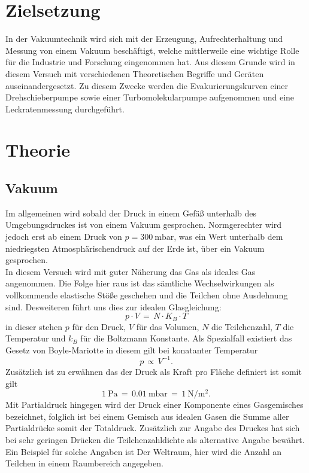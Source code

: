 \section{Zielsetzung}
In der Vakuumtechnik wird sich mit der Erzeugung, Aufrechterhaltung und Messung von einem Vakuum beschäftigt,
welche mittlerweile eine wichtige Rolle für die Industrie und Forschung eingenommen hat. Aus diesem Grunde wird
in diesem Versuch mit verschiedenen Theoretischen Begriffe und Geräten auseinandergesetzt. Zu diesem Zwecke werden
die Evakurierungskurven einer Drehschieberpumpe sowie einer Turbomolekularpumpe aufgenommen und eine Leckratenmessung 
durchgeführt.

\section{Theorie}
\label{sec:Theorie}

\subsection{Vakuum}
\label{sec:vakuumtheo}

Im allgemeinen wird sobald der Druck in einem Gefäß unterhalb des Umgebungsdruckes ist von einem Vakuum gesprochen. Normgerechter 
wird jedoch erst ab einem Druck von $p=\SI{300}{\milli\bar}$, was ein Wert unterhalb dem niedriegsten Atmosphärischendruck auf der 
Erde ist, über ein Vakuum gesprochen.\\
In diesem Versuch wird mit guter Näherung das Gas als ideales Gas angenommen. Die Folge hier raus ist das sämtliche Wechselwirkungen 
als vollkommende elastische Stöße geschehen und die Teilchen ohne Ausdehnung sind. Desweiteren führt uns dies zur idealen Glasgleichung:
\begin {equation}
 p\cdot V\,=\, N\cdot K_B\cdot T
\label{eqn:idealgas}
\end{equation}
in dieser stehen $p$ für den Druck, $V$ für das Volumen, $N$ die Teilchenzahl, $T$ die Temperatur und $k_B$ für die Boltzmann Konstante. 
Als Spezialfall existiert das Gesetz von Boyle-Mariotte in diesem gilt bei konatanter Temperatur 
\begin {equation*}
 p\,\propto \, V^{-1}.
\end{equation*}
Zusätzlich ist zu erwähnen das der Druck als Kraft pro Fläche definiert ist somit gilt
\begin {equation*}
 \SI{1}{\pascal}\,=\,\SI{0.01}{\milli\bar}\,=\,\SI{1}{\newton\per\metre\squared}.
\end{equation*}
Mit Partialdruck hingegen wird der Druck einer Komponente eines Gasgemisches bezeichnet, folglich ist bei einem Gemisch aus 
idealen Gasen die Summe aller Partialdrücke somit der Totaldruck. Zusätzlich zur Angabe des Druckes hat sich bei sehr geringen 
Drücken die Teilchenzahldichte als alternative Angabe bewährt. Ein Beispiel für solche Angaben ist Der Weltraum, hier wird die 
Anzahl an Teilchen in einem Raumbereich angegeben.
